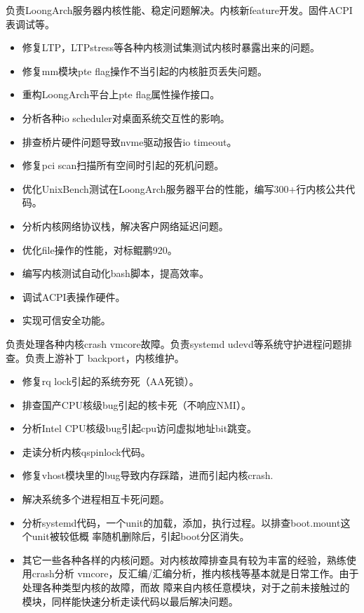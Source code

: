 \documentclass{resume}
\begin{document}
\begin{onehalfspacing}
负责LoongArch服务器内核性能、稳定问题解决。内核新feature开发。固件ACPI表调试等。
\begin{itemize}
  \item 修复LTP，LTPstress等各种内核测试集测试内核时暴露出来的问题。
  \item 修复mm模块pte flag操作不当引起的内核脏页丢失问题。
  \item 重构LoongArch平台上pte flag属性操作接口。
  \item 分析各种io scheduler对桌面系统交互性的影响。
  \item 排查桥片硬件问题导致nvme驱动报告io timeout。
  \item 修复pci scan扫描所有空间时引起的死机问题。
  \item 优化UnixBench测试在LoongArch服务器平台的性能，编写300+行内核公共代码。
  \item 分析内核网络协议栈，解决客户网络延迟问题。
  \item 优化file操作的性能，对标鲲鹏920。
  \item 编写内核测试自动化bash脚本，提高效率。
  \item 调试ACPI表操作硬件。
  \item 实现可信安全功能。
\end{itemize}
\end{onehalfspacing}

\begin{onehalfspacing}
  负责处理各种内核crash vmcore故障。负责systemd udevd等系统守护进程问题排查。负责上游补丁
  backport，内核维护。
  \begin{itemize}
  \item 修复rq lock引起的系统夯死（AA死锁）。
  \item 排查国产CPU核级bug引起的核卡死（不响应NMI）。
  \item 分析Intel CPU核级bug引起cpu访问虚拟地址bit跳变。
  \item 走读分析内核qspinlock代码。
  \item 修复vhost模块里的bug导致内存踩踏，进而引起内核crash.
  \item 解决系统多个进程相互卡死问题。
  \item 分析systemd代码，一个unit的加载，添加，执行过程。以排查boot.mount这个unit被较低概
    率随机删除后，引起boot分区消失。
  \item 其它一些各种各样的内核问题。对内核故障排查具有较为丰富的经验，熟练使用crash分析
    vmcore，反汇编/汇编分析，推内核栈等基本就是日常工作。由于处理各种类型内核的故障，而故
    障来自内核任意模块，对于之前未接触过的模块，同样能快速分析走读代码以最后解决问题。
  \end{itemize}
\end{onehalfspacing}
\end{document}
